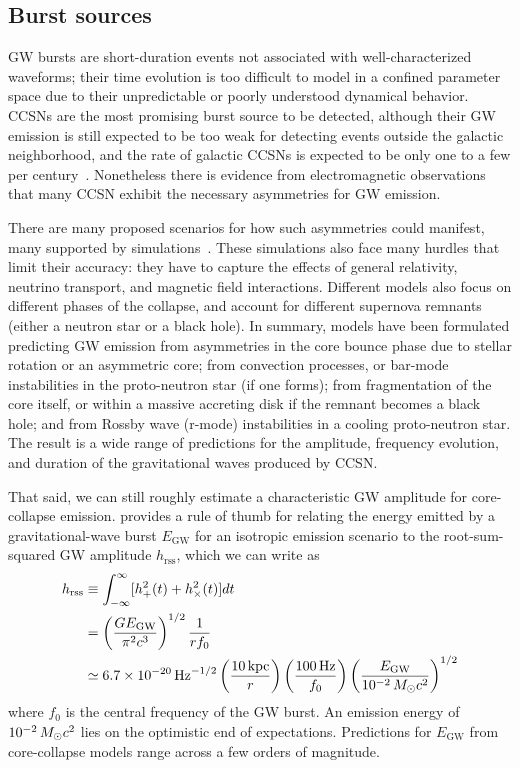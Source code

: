 \subsection{Burst sources}

GW bursts are short-duration events not associated with well-characterized waveforms; their time evolution is too difficult to model in a confined parameter space due to their unpredictable or poorly understood dynamical behavior.
\Acp{CCSN} are the most promising burst source to be detected, although their \ac{GW} emission is still expected to be too weak for detecting events outside the galactic neighborhood, and the rate of galactic \acp{CCSN} is expected to be only one to a few per century~\citep{Adams_2013, Maoz_2010}.
Nonetheless there is evidence from electromagnetic observations that many CCSN exhibit the necessary asymmetries for GW emission.

There are many proposed scenarios for how such asymmetries could manifest, many supported by simulations~\citep{Fryer_2011, Fryer_2002}.
These simulations also face many hurdles that limit their accuracy: they have to capture the effects of general relativity, neutrino transport, and magnetic field interactions.
Different models also focus on different phases of the collapse, and account for different supernova remnants (either a neutron star or a black hole).
In summary, models have been formulated predicting GW emission from asymmetries in the core bounce phase due to stellar rotation or an asymmetric core; from convection processes, or bar-mode instabilities in the proto-neutron star (if one forms); from fragmentation of the core itself, or within a massive accreting disk if the remnant becomes a black hole; and from Rossby wave (r-mode) instabilities in a cooling proto-neutron star.
The result is a wide range of predictions for the amplitude, frequency evolution, and duration of the gravitational waves produced by CCSN.

That said, we can still roughly estimate a characteristic GW amplitude for core-collapse emission.
\citet{Sutton_2013} provides a rule of thumb for relating the energy emitted by a gravitational-wave burst $E_{\mathrm{GW}}$ for an isotropic emission scenario to the root-sum-squared GW amplitude $h_{\mathrm{rss}}$, which we can write as
\begin{align}
	\label{gw-hrss}
	h_{\mathrm{rss}}
		&\equiv \int_{-\infty}^{\infty} [h_+^2(t) + h_{\times}^2(t)] dt\\
		\label{gw-egw}
		&= \left( \frac{G E_{\mathrm{GW}}}{\pi^2 c^3} \right)^{1/2} \frac{1}{r f_0}\\
		&\simeq 6.7 \times 10^{-20}\,\mathrm{Hz}^{-1/2}
			\left( \frac{10\,\mathrm{kpc}}{r} \right)
			\left( \frac{100\,\mathrm{Hz}}{f_0} \right)
			\left( \frac{E_{\mathrm{GW}}}{10^{-2}\,M_{\odot} c^2} \right)^{1/2}
\end{align}
where $f_0$ is the central frequency of the GW burst.
An emission energy of $10^{-2}\,M_{\odot} c^2$ lies on the optimistic end of expectations.
Predictions for $E_{\mathrm{GW}}$ from core-collapse models range across a few orders of magnitude.

